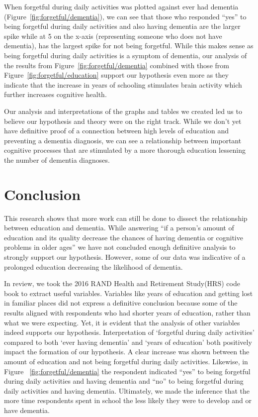 \documentclass{article}
\begin{document}
\hspace*{1em} When forgetful during daily activities was plotted against ever had dementia (Figure~\ref{fig:forgetful/dementia}), we can see that those who responded “yes” to being forgetful during daily activities and also having dementia are the larger spike while at 5 on the x-axis (representing someone who does not have dementia), has the largest spike for not being forgetful. While this makes sense as being forgetful during daily activities is a symptom of dementia, our analysis of the results from Figure~\ref{fig:forgetful/dementia} combined with those from Figure~\ref{fig:forgetful/education} support our hypothesis even more as they indicate that the increase in years of schooling stimulates brain activity which further increases cognitive health.

\hspace*{1em} Our analysis and interpretations of the graphs and tables we created led us to believe our hypothesis and theory were on the right track. While we don't yet have definitive proof of a connection between high levels of education and preventing a dementia diagnosis, we can see a relationship between important cognitive processes that are stimulated by a more thorough education lessening the number of dementia diagnoses. 

\section{Conclusion}
\label{sec:conclusion}

\hspace*{1em} This research shows that more work can still be done to dissect the relationship between education and dementia. While answering “if a person’s amount of education and its quality decrease the chances of having dementia or cognitive problems in older ages” we have not concluded enough definitive analysis to strongly support our hypothesis. However, some of our data was indicative of a prolonged education decreasing the likelihood of dementia. 

In review, we took the 2016 RAND Health and Retirement Study(HRS) code book to extract useful variables. Variables like years of education and getting lost in familiar places did not express a definitive conclusion because some of the results aligned with respondents who had shorter years of education, rather than what we were expecting. Yet, it is evident that the analysis of other variables indeed supports our hypothesis. Interpretation of ‘forgetful during daily activities’ compared to both ‘ever having dementia’ and ‘years of education’ both positively impact the formation of our hypothesis. A clear increase was shown between the amount of education and not being forgetful during daily activities. Likewise, in Figure ~\ref{fig:forgetful/dementia} the respondent indicated “yes” to being forgetful during daily activities and having dementia and “no” to being forgetful during daily activities and having dementia. Ultimately, we made the inference that the more time respondents spent in school the less likely they were to develop and or have dementia. 
\end{document}
